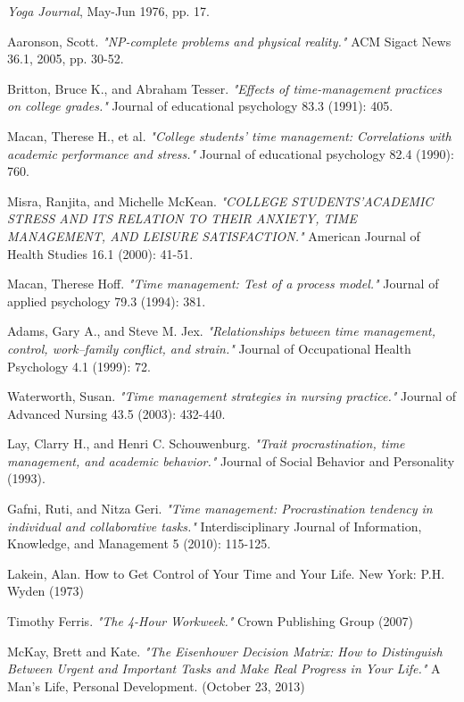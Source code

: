 \documentclass[conference]{IEEEtran}
\begin{document}


\begin{thebibliography}{1}

\emph{Yoga Journal}, \relax May-Jun 1976, pp. 17.

Aaronson, Scott. \emph{"NP-complete problems and physical reality."} ACM Sigact News 36.1, 2005, pp. 30-52.

Britton, Bruce K., and Abraham Tesser. \emph{"Effects of time-management practices on college grades."} Journal of educational psychology 83.3 (1991): 405.

Macan, Therese H., et al. \emph{"College students' time management: Correlations with academic performance and stress."} Journal of educational psychology 82.4 (1990): 760.

Misra, Ranjita, and Michelle McKean. \emph{"COLLEGE STUDENTS'ACADEMIC STRESS AND ITS RELATION TO THEIR ANXIETY, TIME MANAGEMENT, AND LEISURE SATISFACTION."} American Journal of Health Studies 16.1 (2000): 41-51.

Macan, Therese Hoff. \emph{"Time management: Test of a process model."} Journal of applied psychology 79.3 (1994): 381.

Adams, Gary A., and Steve M. Jex. \emph{"Relationships between time management, control, work–family conflict, and strain."} Journal of Occupational Health Psychology 4.1 (1999): 72.

Waterworth, Susan. \emph{"Time management strategies in nursing practice."} Journal of Advanced Nursing 43.5 (2003): 432-440.

Lay, Clarry H., and Henri C. Schouwenburg. \emph{"Trait procrastination, time management, and academic behavior."} Journal of Social Behavior and Personality (1993).

Gafni, Ruti, and Nitza Geri. \emph{"Time management: Procrastination tendency in individual and collaborative tasks."} Interdisciplinary Journal of Information, Knowledge, and Management 5 (2010): 115-125.

Lakein, Alan. How to Get Control of Your Time and Your Life. New York: P.H. Wyden (1973)

Timothy Ferris. \emph{"The 4-Hour Workweek."} Crown Publishing Group (2007)

McKay, Brett and Kate. \emph{"The Eisenhower Decision Matrix: How to Distinguish Between Urgent and Important Tasks and Make Real Progress in Your Life."} A Man's Life, Personal Development. (October 23, 2013)


\end{thebibliography}




\end{document}
